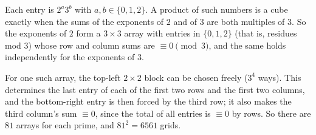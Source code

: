 Each entry is $2^a3^b$ with $a,b\in\{0,1,2\}$. A product of such numbers is a cube exactly when the sums of the exponents of $2$ and of $3$ are both multiples of $3$. So the exponents of $2$ form a $3\times3$ array with entries in $\{0,1,2\}$ (that is, residues mod $3$) whose row and column sums are $\equiv0\pmod3$, and the same holds independently for the exponents of $3$.

For one such array, the top-left $2\times2$ block can be chosen freely ($3^4$ ways). This determines the last entry of each of the first two rows and the first two columns, and the bottom-right entry is then forced by the third row; it also makes the third column's sum $\equiv0$, since the total of all entries is $\equiv0$ by rows. So there are $81$ arrays for each prime, and $81^2=\boxed{6561}$ grids.
